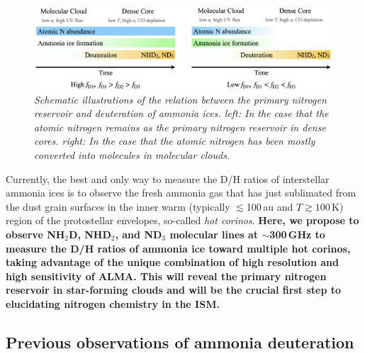 \documentclass[12pt,a4paper]{article}  %
\begin{document}
\begin{figure}[th]
    \centering
    \includegraphics[width=\textwidth]{ammonia_deuteration_cartoon_no_schemfig_ver3_inverted.png}
    \caption{\emph{Schematic illustrations of the relation between the primary nitrogen reservoir and deuteration of ammonia ices. \textit{left:} In the case that the atomic nitrogen remains as the primary nitrogen reservoir in dense cores.  %
    \textit{right:} In the case that the atomic nitrogen has been mostly converted into molecules in molecular clouds.} %
    }
    \vspace{0em}
    \label{fig:ammonia_deuteration}
\end{figure}


Currently, the best and only way to measure the D/H ratios of interstellar ammonia ices is to observe the fresh ammonia gas that has just sublimated from the dust grain surfaces in the inner warm (typically $\lesssim$100\,au and $T\gtrsim100$\,K) region of the protostellar envelopes, so-called \textit{hot corinos}. \textbf{Here, we propose to observe NH$_2$D, NHD$_2$, and ND$_3$ molecular lines at $\sim$300\,GHz to measure the D/H ratios of ammonia ice toward multiple hot corinos, taking advantage of the unique combination of high resolution and high sensitivity of ALMA. This will reveal the primary nitrogen reservoir in star-forming clouds and will be the crucial first step to elucidating nitrogen chemistry in the ISM.}

\vspace{-1em}
\subsection{Previous observations of ammonia deuteration}
\end{document}
